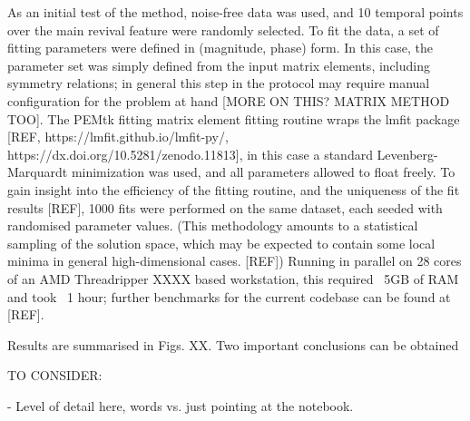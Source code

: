 As an initial test of the method, noise-free data was used, and 10 temporal points over the main revival feature were randomly selected. To fit the data, a set of fitting parameters were defined in (magnitude, phase) form. In this case, the parameter set was simply defined from the input matrix elements, including symmetry relations; in general this step in the protocol may require manual configuration for the problem at hand [MORE ON THIS? MATRIX METHOD TOO]. The PEMtk fitting matrix element fitting routine wraps the lmfit package [REF, https://lmfit.github.io/lmfit-py/, https://dx.doi.org/10.5281/zenodo.11813], in this case a standard Levenberg-Marquardt minimization was used, and all parameters allowed to float freely. To gain insight into the efficiency of the fitting routine, and the uniqueness of the fit results [REF], 1000 fits were performed on the same dataset, each seeded with randomised parameter values. (This methodology amounts to a statistical sampling of the solution space, which may be expected to contain some local minima in general high-dimensional cases. [REF]) Running in parallel on 28 cores of an AMD Threadripper XXXX based workstation, this required ~5GB of RAM and took ~1 hour; further benchmarks for the current codebase can be found at [REF].

Results are summarised in Figs. XX. Two important conclusions can be obtained

TO CONSIDER:

- Level of detail here, words vs. just pointing at the notebook.